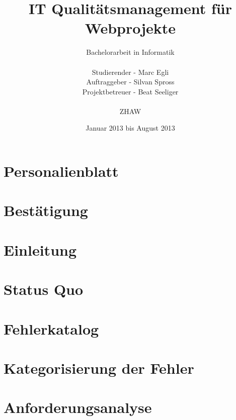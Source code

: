\documentclass[
11pt, %
a4paper, %
BCOR10mm, %
DIV14, %
footsepline = false, %
headsepline, %
oneside, %
openright,
parskip=half, %
abstracton, %
listof=totocnumbered, %
bibliography=totocnumbered %
]{scrreprt}
\title{IT Qualitätsmanagement für Webprojekte}
\author{Bachelorarbeit in Informatik\\
    \\
    Studierender - Marc Egli\\
	Auftraggeber - Silvan Spross\\
    Projektbetreuer - Beat Seeliger\\
	\\
	ZHAW}
\date{Januar 2013 bis August 2013}
\begin{document}
  \ifpdf
  \else
  \fi
  
  \maketitle
  \begin{abstract}
    
  \end{abstract}

  
  \tableofcontents
  
  \chapter{Personalienblatt}
  
  
  \chapter{Bestätigung}
  
  
  \chapter{Einleitung}
  \label{cha:Einleitung}
  
  
  \chapter{Status Quo}
  \label{cha:status_quo}
  
  
  \chapter{Fehlerkatalog}
  \label{cha:fehlerkatalog}
  

  \chapter{Kategorisierung der Fehler}
  \label{cha:kategorisierung_der_fehler}
  
  
  \chapter{Anforderungsanalyse}
  \label{cha:anforderungsanalyse}
  
  
\end{document}
